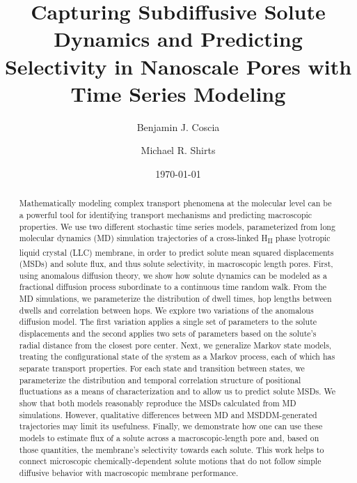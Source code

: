 \documentclass[aps,pre,preprint,groupedaddress]{revtex4-2}
\begin{document}
  
  \title{Capturing Subdiffusive Solute Dynamics and Predicting Selectivity in Nanoscale Pores
  with Time Series Modeling}
  
  \author{Benjamin J. Coscia}
  \author{Michael R. Shirts}
  

  \date{\today}
  
  \begin{abstract}
  
  Mathematically modeling complex transport phenomena at the molecular level 
  can be a powerful tool for identifying transport mechanisms and predicting
  macroscopic properties. We use two different stochastic time series models,
  parameterized from long molecular dynamics (MD) simulation trajectories of
  a cross-linked H\textsubscript{II} phase lyotropic liquid crystal (LLC) 
  membrane, in order to predict solute mean squared displacements (MSDs) 
  and solute flux, and thus solute selectivity, in macroscopic length pores. 
  First, using anomalous diffusion theory, we show how solute dynamics can be
  modeled as a fractional diffusion process subordinate to a continuous time 
  random walk. From the MD simulations, we parameterize the distribution of 
  dwell times, hop lengths between dwells and correlation between hops. We 
  explore two variations of the anomalous diffusion model. The first variation
  applies a single set of parameters to the solute displacements and the second
  applies two sets of parameters based on the solute's radial distance from the
  closest pore center. Next, we generalize Markov state models, treating the
  configurational state of the system as a Markov process, each
  of which has separate transport properties. For each state and transition
  between states, we parameterize the distribution and temporal correlation 
  structure of positional fluctuations as a means of characterization and to 
  allow us to predict solute MSDs. We show that both models reasonably reproduce
  the MSDs calculated from MD simulations. 
  However, qualitative differences between MD and 
  MSDDM-generated  %
  trajectories
  may limit its usefulness. 
  Finally, we demonstrate how one can use 
  these 
  models to estimate flux of a solute
  across a macroscopic-length pore and, based on those quantities, the membrane's selectivity towards each solute.
  This work helps to connect microscopic chemically-dependent solute 
  motions 
  that do not follow simple diffusive behavior with 
  macroscopic membrane performance.

  \end{abstract}
\end{document}
